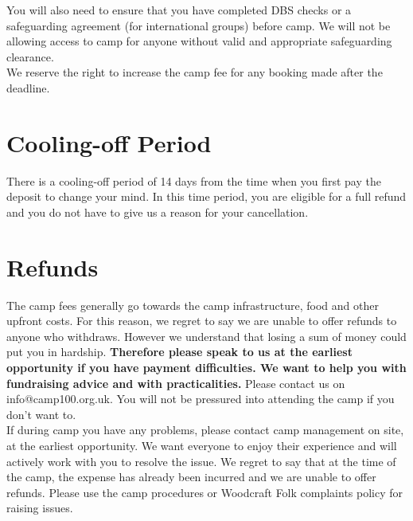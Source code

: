 \documentclass[a4paper, 11pt]{report}
\begin{document}
You will also need to ensure that you have completed DBS checks or a safeguarding agreement (for international groups) before camp. We will not be allowing access to camp for anyone without valid and appropriate safeguarding clearance. \\

We reserve the right to increase the camp fee for any booking made after the deadline.

\section{Cooling-off Period}
There is a cooling-off period of 14 days from the time when you first pay the deposit to change your mind. In this time period, you are eligible for a full refund and you do not have to give us a reason for your cancellation. 

\section{Refunds}
The camp fees generally go towards the camp infrastructure, food and other upfront costs.  For this reason, we regret to say we are unable to offer refunds to anyone who withdraws. However we understand that losing a sum of money could put you in hardship. \textbf{Therefore please speak to us at the earliest opportunity if you have payment difficulties. We want to help you with fundraising advice and with practicalities.} Please contact us on info@camp100.org.uk. You will not be pressured into attending the camp if you don't want to.\\ 
 
If during camp you have any problems, please contact camp management on site, at the earliest opportunity. We want everyone to enjoy their experience and will actively work with you to resolve the issue. We regret to say that at the time of the camp, the expense has already been incurred and we are unable to offer refunds. Please use the camp procedures or Woodcraft Folk complaints policy for raising issues.




\makedocumentbackpage
\end{document}
